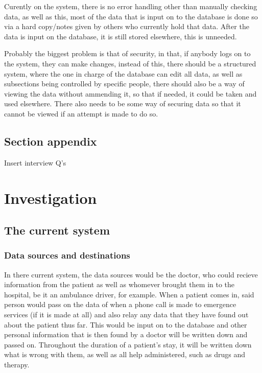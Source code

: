 Curently on the system, there is no error handling other than manually checking data, as well as this, most of the data that is input on to the database is done so via a hard copy/notes given by others who currently hold that data. After the data is input on the database, it is still stored elsewhere, this is unneeded.

Probably the biggest problem is that of security, in that, if anybody logs on to the system, they can make changes, instead of this, there should be a structured system, where the one in charge of the database can edit all data, as well as subsections being controlled by specific people, there should also be a way of viewing the data without ammending it, so that if needed, it could be taken and used elsewhere. There also needs to be some way of securing data so that it cannot be viewed if an attempt is made to do so.

\subsection{Section appendix}

Insert interview Q's

\section{Investigation}

\subsection{The current system}

\subsubsection{Data sources and destinations}
In there current system, the data sources would be the doctor, who could recieve information from the patient as well as whomever brought them in to the hospital, be it an ambulance driver, for example. When a patient comes in, said person would pass on the data of when a phone call is made to emergence services (if it is made at all) and also relay any data that they have found out about the patient thus far. This would be input on to the database and other personal information that is then found by a doctor will be written down and passed on. Throughout the duration of a patient's stay, it will be written down what is wrong with them, as well as all help administered, such as drugs and therapy.

